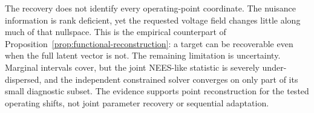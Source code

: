 

The recovery does not identify every operating-point coordinate. The nuisance information is rank deficient, yet the requested voltage field changes little along much of that nullspace. This is the empirical counterpart of Proposition~\ref{prop:functional-reconstruction}: a target can be recoverable even when the full latent vector is not. The remaining limitation is uncertainty. Marginal intervals cover, but the joint NEES-like statistic is severely under-dispersed, and the independent constrained solver converges on only part of its small diagnostic subset. The evidence supports point reconstruction for the tested operating shifts, not joint parameter recovery or sequential adaptation.
